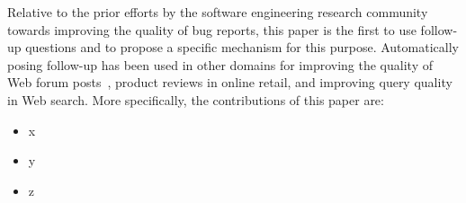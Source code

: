 Relative to the prior efforts by the software engineering research community towards improving the quality of bug reports, this paper is the first to use follow-up questions and to propose a specific mechanism for this purpose. Automatically posing follow-up has been used in other domains for improving the quality of Web forum posts~\cite{rao-daume-iii-2018-learning}, product reviews in online retail, and improving query quality in Web search. More specifically, the contributions of this paper are:

\begin{itemize}
\item x
\item y
\item z
\end{itemize}
